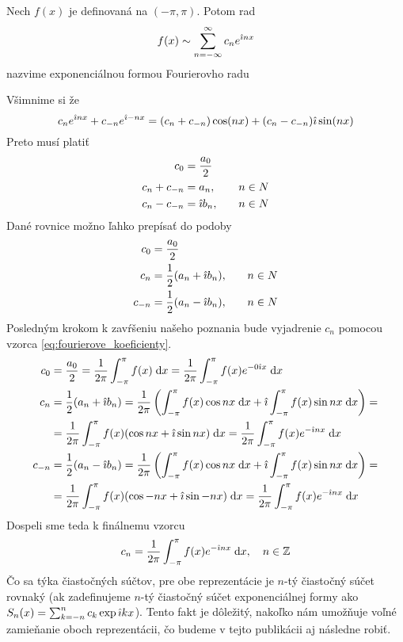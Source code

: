 \begin{definicia}
    Nech $f(x)$ je definovaná na $(-\pi,\pi)$. Potom rad
    \begin{equation}
        f(x) \sim \sum_{n=-\infty}^{\infty} c_n e^{\hat{\imath} n x}
        \label{eq:exp_form}
    \end{equation}
    nazvime exponenciálnou formou Fourierovho radu
    \label{def:exp_form}
\end{definicia}
Všimnime si že
\begin{equation}
    c_n e^{\hat{\imath} n x} + c_{-n} e^{\hat{\imath} -n x} =
     (c_n +c_{-n}) \cos(nx) + (c_n - c_{-n}) \hat{\imath} \sin(nx)
\end{equation}
Preto musí platiť
\begin{align}
    c_0 &= \frac{a_0}{2} \\
    c_n + c_{-n} &= a_n, \quad & n \in N \\
    c_n - c_{-n} &= \hat{\imath} b_n, \quad & n \in N
    \label{eq:koeficienty_to_trie}
\end{align}
Dané rovnice možno ľahko prepísať do podoby
\begin{align}
    c_0 &= \frac{a_0}{2} \\
    c_n &= \frac{1}{2}(a_n + \hat{\imath} b_n), \quad & n \in N \\
    c_{-n} &=\frac{1}{2}(a_n - \hat{\imath} b_n), \quad & n \in N
    \label{eq:koeficienty_to_exp}
\end{align}
Posledným krokom k zavŕšeniu našeho poznania bude vyjadrenie $c_n$
pomocou vzorca \ref{eq:fourierove_koeficienty}.
\begin{align}
    c_0 &= \frac{a_0}{2} = \frac{1}{2\pi} \int_{-\pi}^{\pi} f(x) \; \mathrm{d} x = 
            \frac{1}{2\pi} \int_{-\pi}^{\pi} f(x) e^{-0 \hat{\imath} x} \; \mathrm{d} x \\
    c_n &= \frac{1}{2}(a_n + \hat{\imath} b_n) =
          \frac{1}{2\pi}\left(
            \int_{-\pi}^{\pi} f(x) \cos nx \; \mathrm{d} x + 
            \hat{\imath} \int_{-\pi}^{\pi} f(x) \sin nx \; \mathrm{d} x  
            \right) = \\
         &=\frac{1}{2\pi} \int_{-\pi}^{\pi} f(x) (\cos nx + \hat{\imath} \sin nx) \; \mathrm{d} x =
          \frac{1}{2\pi} \int_{-\pi}^{\pi} f(x) e^{- \hat{\imath} n x} \; \mathrm{d} x \\
    c_{-n} &= \frac{1}{2}(a_n - \hat{\imath} b_n) =
          \frac{1}{2\pi}\left(
            \int_{-\pi}^{\pi} f(x) \cos nx \; \mathrm{d} x + 
            \hat{\imath} \int_{-\pi}^{\pi} f(x) \sin nx \; \mathrm{d} x  
            \right) = \\
         &=\frac{1}{2\pi} \int_{-\pi}^{\pi} f(x) (\cos -nx + \hat{\imath} \sin -nx) \; \mathrm{d} x =
          \frac{1}{2\pi} \int_{-\pi}^{\pi} f(x) e^{- \hat{\imath} n x} \; \mathrm{d} x        
\end{align}
Dospeli sme teda k finálnemu vzorcu
\begin{equation}
    c_n = \frac{1}{2\pi} \int_{-\pi}^{\pi} f(x) e^{-\hat{\imath} n x} \; \mathrm{d} x, 
        \quad n\in \mathbb{Z}
    \label{eq:fourierove_exp_koeficienty}
\end{equation}
Čo sa týka čiastočných súčtov, pre obe reprezentácie je $n$-tý
čiastočný súčet rovnaký (ak zadefinujeme $n$-tý čiastočný súčet
exponenciálnej formy ako $S_n(x) = \sum_{k=-n}^{n} c_k \exp{\hat{\imath}k
x}$). Tento fakt je dôležitý, nakoľko nám umožňuje voľné zamieňanie
oboch reprezentácii, čo budeme v tejto publikácii aj následne robiť.

